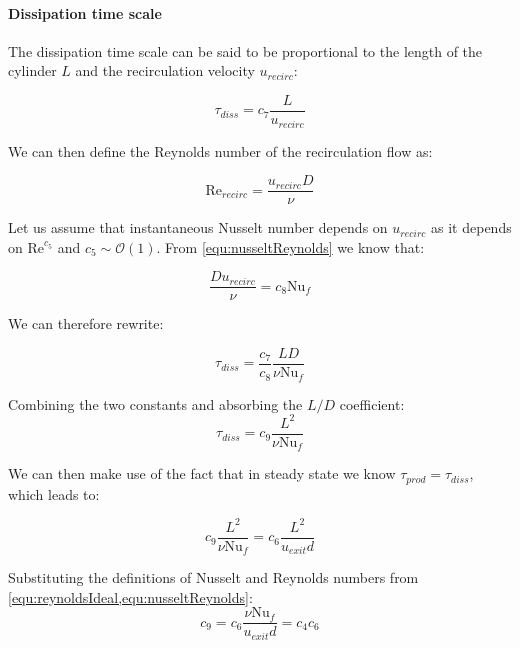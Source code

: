 \paragraph{Dissipation time scale}
The dissipation time scale can be said to be proportional to the length of the cylinder $L$ and the recirculation velocity $u_{recirc}$: 

\begin{equation}
\tau_{diss} = c_7 \frac{L}{u_{recirc}}
\end{equation}

\noindent We can then define the Reynolds number of the recirculation flow as:

\begin{equation}
\text{Re}_{recirc} = \frac{u_{recirc} D}{\nu}
\end{equation}


\noindent Let us assume that instantaneous Nusselt number depends on $u_{recirc}$ as it depends on $\text{Re}^{c_5}$ and $c_5\sim\mathcal{O}(1)$. From \cref{equ:nusseltReynolds} we know that: 

\begin{equation}
\frac{D u_{recirc}}{\nu} = c_8 \text{Nu}_f
\end{equation}

\noindent We can therefore rewrite:

\begin{equation}
\tau_{diss} = \frac{c_7}{c_8} \frac{LD}{\nu \text{Nu}_f}
\end{equation}

\noindent Combining the two constants and absorbing the $L/D$ coefficient:
\begin{equation}
\tau_{diss} = c_9 \frac{L^2}{\nu \text{Nu}_f}
\end{equation}

\noindent We can then make use of the fact that in steady state we know $\tau_{prod} = \tau_{diss}$, which leads to:

\begin{equation}
c_9 \frac{L^2}{\nu \text{Nu}_f} = c_6 \frac{L^2}{u_{exit} d}
\end{equation}

\noindent  Substituting the definitions of Nusselt and Reynolds numbers from \cref{equ:reynoldsIdeal,equ:nusseltReynolds}:
\begin{equation}
c_9 = c_6 \frac{\nu\text{Nu}_f}{u_{exit}d} = c_4 c_6
\end{equation}

